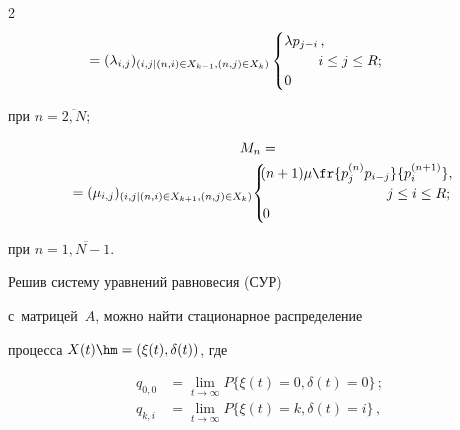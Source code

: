 \begin{multicols}{2}
\begin{align}
&\hspace*{-9mm}{}=(\lambda_{i,j})_{(i,j\vert(n,i)\in X_{k-1},(n,j)\in X_k)} 

\begin{cases}

\lambda p_{j-i}\,, &\\

&\hspace*{-5mm} i\leq j\leq R;\\

0 &

\end{cases}

\end{align}

при $n=\overline{2,N}$;

\begin{multline}

{M}_n ={}\\

\hspace*{-1mm}{}= (\mu_{i,j})_{(i,j\vert(n,i)\in X_{k+1},(n,j)\in X_k)}\!

\begin{cases}\!

\!(n+1)\mu\fr{p_j^{(n)} p_{i-j}}{p_i^{(n+1)}}, &\\

&\hspace*{-20mm} j\leq i\leq R;\\

\!0 &

\end{cases}\!\!\!\!\!\!\!\!\!

\label{e8-v}

\end{multline}

при $n=\overline{1,N-1}$.



  Решив систему уравнений равновесия (СУР) 

  с~матрицей~$A$, можно найти стационарное распределение 

процесса $X(t)\hm= (\xi(t),\delta(t))$, где 

  \begin{align*}

  q_{0,0}& = \lim\limits_{t\to\infty} P\{\xi(t)=0,\delta(t)=0\}\,;\\

  q_{k,i} &=\lim\limits_{t\to\infty} P\{\xi(t)=k,\delta(t)=i\}\,,\\


\end{align*}
\end{multicols}
